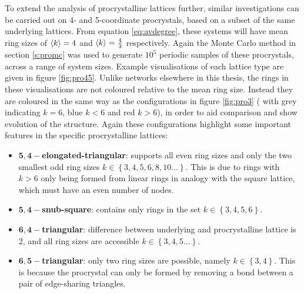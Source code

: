 To extend the analysis of procrystalline lattices further, similar investigations can be carried out on 4\-- and 5\--coordinate procrystals, based on a subset of the same underlying lattices.
From equation \eqref{eq:avdegree}, these systems will have mean ring sizes of $\langle k \rangle=4$ and $\langle k \rangle=\frac{4}{3}$ respectively.
Again the Monte Carlo method in section \ref{s:promc} was used to generate $10^5$ periodic samples of these procrystals, across a range of system sizes.
Example visualisations of each lattice type are given in figure \ref{fig:pro45}.
Unlike networks elsewhere in this thesis, the rings in these visualisations are not coloured relative to the mean ring size.
Instead they are coloured in the same way as the configurations in figure \ref{fig:pro3} (\ie{} with grey indicating $k=6$, blue $k<6$ and red $k>6$), in order to aid comparison and show evolution of the structure. 
Again these configurations highlight some important features in the specific procrystalline lattices:

\begin{itemize}
	
	\item $\mathbf{5,4-}$\textbf{elongated\--triangular}: supports all even ring sizes and only the two smallest odd ring sizes \ie{} $k\in\left\{3,4,5,6,8,10\dots\right\}$. This is due to rings with $k>6$ only being formed from linear rings in analogy with the square lattice, which must have an even number of nodes.
	\item $\mathbf{5,4-}$\textbf{snub\--square}: contains only rings in the set $k\in\left\{3,4,5,6\right\}$.
	\item $\mathbf{6,4-}$\textbf{triangular}: difference between underlying and procrystalline lattice is 2, and all ring sizes are accessible $k\in\left\{3,4,5\dots\right\}$.
	\item $\mathbf{6,5-}$\textbf{triangular}: only two ring sizes are possible, namely $k\in\left\{3,4\right\}$. This is because the procrystal can only be formed by removing a bond between a pair of edge\--sharing triangles.
	
\end{itemize}

